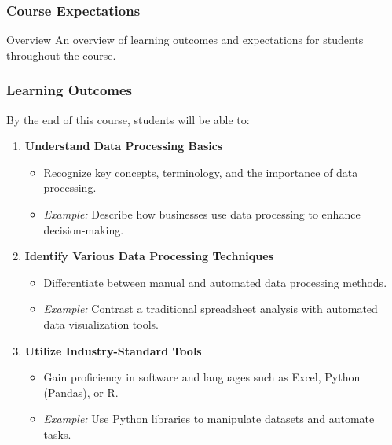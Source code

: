 \documentclass[aspectratio=169]{beamer}
\begin{document}
\begin{frame}[fragile]
    \frametitle{Course Expectations}
    \begin{block}{Overview}
        An overview of learning outcomes and expectations for students throughout the course.
    \end{block}
\end{frame}

\begin{frame}[fragile]
    \frametitle{Learning Outcomes}
    By the end of this course, students will be able to:
    \begin{enumerate}
        \item \textbf{Understand Data Processing Basics}
        \begin{itemize}
            \item Recognize key concepts, terminology, and the importance of data processing.
            \item \textit{Example:} Describe how businesses use data processing to enhance decision-making.
        \end{itemize}

        \item \textbf{Identify Various Data Processing Techniques}
        \begin{itemize}
            \item Differentiate between manual and automated data processing methods.
            \item \textit{Example:} Contrast a traditional spreadsheet analysis with automated data visualization tools.
        \end{itemize}

        \item \textbf{Utilize Industry-Standard Tools}
        \begin{itemize}
            \item Gain proficiency in software and languages such as Excel, Python (Pandas), or R.
            \item \textit{Example:} Use Python libraries to manipulate datasets and automate tasks.
        \end{itemize}
    \end{enumerate}
\end{frame}
\end{document}
